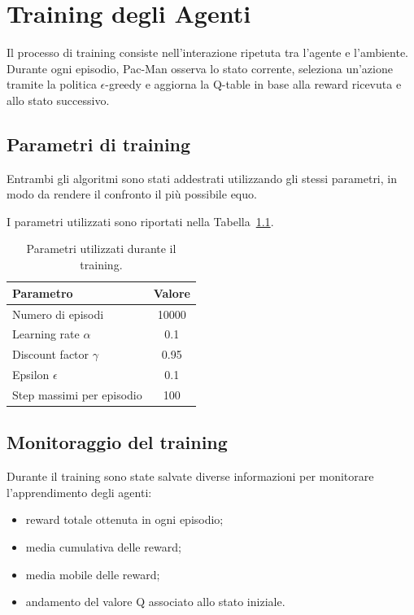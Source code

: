 \documentclass[12pt,a4paper]{report}
\begin{document}
\chapter{Training degli Agenti}

Il processo di training consiste nell’interazione ripetuta tra l’agente e l’ambiente. Durante ogni episodio, Pac-Man osserva lo stato corrente, seleziona un’azione tramite la politica $\epsilon$-greedy e aggiorna la Q-table in base alla reward ricevuta e allo stato successivo.

\section{Parametri di training}

Entrambi gli algoritmi sono stati addestrati utilizzando gli stessi parametri, in modo da rendere il confronto il più possibile equo.

I parametri utilizzati sono riportati nella Tabella~\ref{tab:parametri_training}.

\begin{table}[H]
\centering
\begin{tabular}{lc}
\hline
Parametro & Valore \\
\hline
Numero di episodi & 10000 \\
Learning rate $\alpha$ & 0.1 \\
Discount factor $\gamma$ & 0.95 \\
Epsilon $\epsilon$ & 0.1 \\
Step massimi per episodio & 100 \\
\hline
\end{tabular}
\caption{Parametri utilizzati durante il training.}
\label{tab:parametri_training}
\end{table}

\section{Monitoraggio del training}

Durante il training sono state salvate diverse informazioni per monitorare l’apprendimento degli agenti:

\begin{itemize}
    \item reward totale ottenuta in ogni episodio;
    \item media cumulativa delle reward;
    \item media mobile delle reward;
    \item andamento del valore Q associato allo stato iniziale.
\end{itemize}
\end{document}
